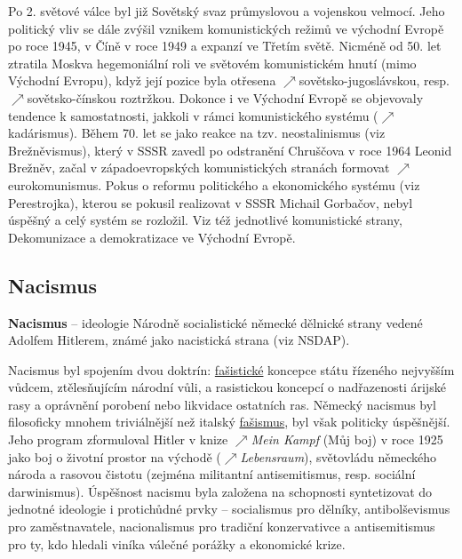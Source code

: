 \documentclass{article}
\begin{document}
  Po 2. světové válce byl již Sovětský svaz průmyslovou a vojenskou velmocí. Jeho politický vliv se dále zvýšil vznikem komunistických režimů ve východní Evropě po roce 1945, v Číně v roce 1949 a expanzí ve Třetím světě. Nicméně od 50. let ztratila Moskva hegemoniální roli ve světovém komunistickém hnutí (mimo Východní Evropu), když její pozice byla otřesena $\nearrow$sovětsko-jugoslávskou, resp. $\nearrow$sovětsko-čínskou roztržkou. Dokonce i ve Východní Evropě se objevovaly tendence k samostatnosti, jakkoli v rámci komunistického systému ($\nearrow$kadárismus). Během 70. let se jako reakce na tzv. neostalinismus (viz Brežněvismus), který v SSSR zavedl po odstranění Chruščova v roce 1964 Leonid Brežněv, začal v západoevropských komunistických stranách formovat $\nearrow$eurokomunismus. Pokus o reformu politického a ekonomického systému (viz Perestrojka), kterou se pokusil realizovat v SSSR Michail Gorbačov, nebyl úspěšný a celý systém se rozložil. Viz též jednotlivé komunistické strany, Dekomunizace a demokratizace ve Východní Evropě.

  \subsection*{Nacismus~\cite{Pecenka:}}
  \label{sec:nacismus}

  {\bf Nacismus} -- ideologie Národně socialistické německé dělnické strany vedené Adolfem Hitlerem, známé jako nacistická strana (viz NSDAP).

  Nacismus byl spojením dvou doktrín: \hyperref[sec:fasismus]{fašistické} koncepce státu řízeného nejvyšším vůdcem, ztělesňujícím národní vůli, a rasistickou koncepcí o nadřazenosti árijské rasy a oprávnění porobení nebo likvidace ostatních ras. Německý nacismus byl filosoficky mnohem triviálnější než italský \hyperref[sec:fasismus]{fašismus}, byl však politicky úspěšnější. Jeho program zformuloval Hitler v knize $\nearrow${\it Mein Kampf} (Můj boj) v roce 1925 jako boj o životní prostor na východě ($\nearrow${\it Lebensraum}), světovládu německého národa a rasovou čistotu (zejména militantní antisemitismus, resp. sociální darwinismus). Úspěšnost nacismu byla založena na schopnosti syntetizovat do jednotné ideologie i protichůdné prvky -- socialismus pro dělníky, antibolševismus pro zaměstnavatele, nacionalismus pro tradiční konzervativce a antisemitismus pro ty, kdo hledali viníka válečné porážky a ekonomické krize.
\end{document}
